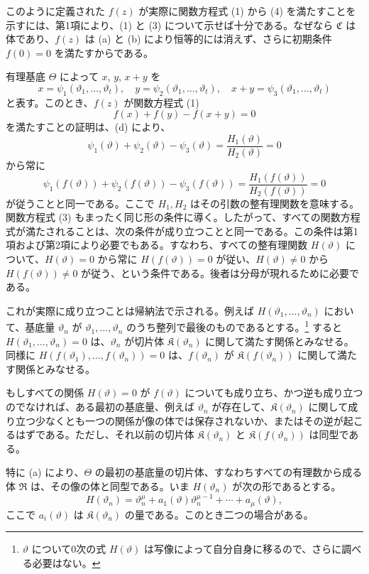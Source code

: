 このように定義された $f(z)$ が実際に関数方程式 (1) から (4) を満たすことを示すには、第1項により、(1) と (3) について示せば十分である。なぜなら $\mathfrak C$ は体であり、$f(z)$ は (a) と (b) により恒等的には消えず、さらに初期条件 $f(0)=0$ を満たすからである。

有理基底 $\Theta$ によって $x$, $y$, $x+y$ を
\[
x=\psi_1(\vartheta_1,\ldots,\vartheta_t),\quad
 y=\psi_2(\vartheta_1,\ldots,\vartheta_t),\quad
 x+y=\psi_3(\vartheta_1,\ldots,\vartheta_t)
\]
と表す。このとき、$f(z)$ が関数方程式 (1)
\[
f(x)+f(y)-f(x+y)=0
\]
を満たすことの証明は、(d) により、
\[
\psi_1(\vartheta)+\psi_2(\vartheta)-\psi_3(\vartheta)=\frac{H_1(\vartheta)}{H_2(\vartheta)}=0
\]
から常に
\[
\psi_1(f(\vartheta))+\psi_2(f(\vartheta))-\psi_3(f(\vartheta))
=\frac{H_1(f(\vartheta))}{H_2(f(\vartheta))}=0
\]
が従うことと同一である。ここで $H_1,H_2$ はその引数の整有理関数を意味する。関数方程式 (3) もまったく同じ形の条件に導く。したがって、すべての関数方程式が満たされることは、次の条件が成り立つことと同一である。この条件は第1項および第2項により必要でもある。すなわち、すべての整有理関数 $H(\vartheta)$ について、$H(\vartheta)=0$ から常に $H(f(\vartheta))=0$ が従い、$H(\vartheta)\ne0$ から $H(f(\vartheta))\ne0$ が従う、という条件である。後者は分母が現れるために必要である。

これが実際に成り立つことは帰納法で示される。例えば $H(\vartheta_1,\ldots,\vartheta_n)$ において、基底量 $\vartheta_n$ が $\vartheta_1,\ldots,\vartheta_n$ のうち整列で最後のものであるとする。\footnote{$\vartheta$ について0次の式 $H(\vartheta)$ は写像によって自分自身に移るので、さらに調べる必要はない。} すると $H(\vartheta_1,\ldots,\vartheta_n)=0$ は、$\vartheta_n$ が切片体 $\mathfrak K(\vartheta_n)$ に関して満たす関係とみなせる。同様に $H(f(\vartheta_1),\ldots,f(\vartheta_n))=0$ は、$f(\vartheta_n)$ が $\mathfrak K(f(\vartheta_n))$ に関して満たす関係とみなせる。

もしすべての関係 $H(\vartheta)=0$ が $f(\vartheta)$ についても成り立ち、かつ逆も成り立つのでなければ、ある最初の基底量、例えば $\vartheta_n$ が存在して、$\mathfrak K(\vartheta_n)$ に関して成り立つ少なくとも一つの関係が像の体では保存されないか、またはその逆が起こるはずである。ただし、それ以前の切片体 $\mathfrak K(\vartheta_n)$ と $\mathfrak K(f(\vartheta_n))$ は同型である。

特に (a) により、$\Theta$ の最初の基底量の切片体、すなわちすべての有理数から成る体 $\mathfrak R$ は、その像の体と同型である。いま $H(\vartheta_n)$ が次の形であるとする。
\[
H(\vartheta_n)=\vartheta_n^{\mu}+a_1(\vartheta)\vartheta_n^{\mu-1}+\cdots+a_\mu(\vartheta),
\]
ここで $a_i(\vartheta)$ は $\mathfrak K(\vartheta_n)$ の量である。このとき二つの場合がある。

